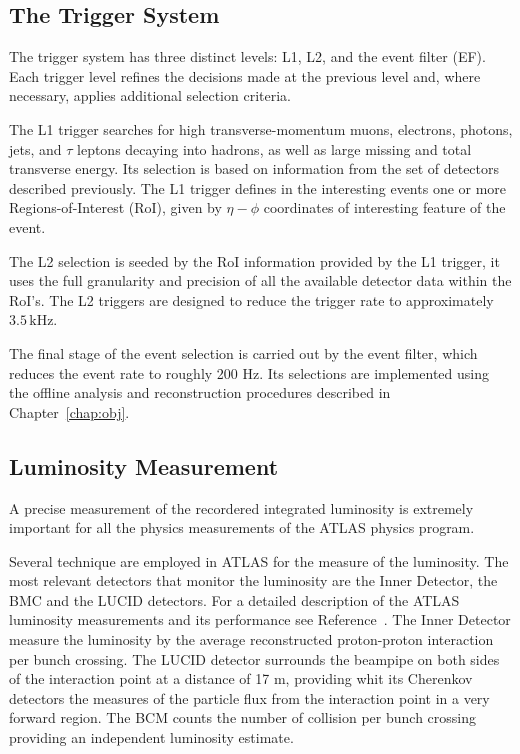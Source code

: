 \subsection{The Trigger System}
The trigger system has three distinct levels: L1, L2, and the event filter (EF). Each trigger level
refines the decisions made at the previous level and, where necessary, applies additional selection
criteria.

The L1 trigger searches for high transverse-momentum muons, electrons, photons, jets, and $\tau$ 
leptons decaying into hadrons, as well as large missing and total transverse energy.
Its selection is based on information from the set of detectors described previously.
The L1 trigger defines in the interesting events one or more Regions-of-Interest (RoI), given by $\eta-\phi$ coordinates
of interesting feature of the event.

The L2 selection is seeded by the RoI information provided by the L1 trigger, it uses the full granularity and precision of 
all the available detector data within the RoI’s. The L2 triggers are designed to reduce the
trigger rate to approximately $3.5\,\text{kHz}$.

The final stage of the event selection is carried out by the event filter, which reduces
the event rate to roughly 200 Hz. Its selections are implemented using the offline analysis and reconstruction procedures 
described in Chapter~\ref{chap:obj}.


\subsection{Luminosity Measurement}
A precise measurement of the recordered integrated luminosity is extremely important for all the physics measurements of the ATLAS physics program.

Several technique are employed in ATLAS for the measure of the luminosity. The most relevant detectors that  monitor the 
luminosity are the Inner Detector, the BMC and the LUCID detectors. For a detailed description of the ATLAS luminosity measurements
and its performance see Reference~\cite{luminosity}.
The Inner Detector measure the luminosity by the average reconstructed proton-proton interaction per bunch crossing.
The LUCID detector surrounds the beampipe on both sides of the interaction point at a distance of 17 m, providing whit its Cherenkov
detectors the measures of the particle flux from the interaction point in a very forward region. The BCM counts the number of collision per 
bunch crossing providing an independent luminosity estimate.











